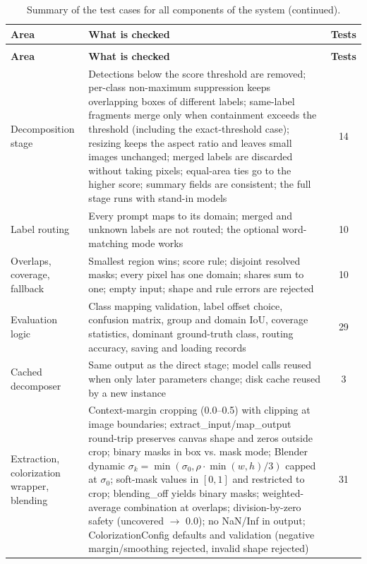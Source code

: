 \documentclass{FastFyp}
\begin{document}
 
\begin{longtable}{|p{3.4cm}|p{6.8cm}|c|}
\caption{Summary of the test cases for all components of the system.}
\label{tab:a_test_summary} \\
\hline
\textbf{Area} & \textbf{What is checked} & \textbf{Tests} \\ \hline
\endfirsthead
\caption[]{Summary of the test cases for all components of the system (continued).} \\
\hline
\textbf{Area} & \textbf{What is checked} & \textbf{Tests} \\ \hline
\endhead
\hline
\endfoot
\hline
\endlastfoot
Decomposition stage & Detections below the score threshold are removed; per-class non-maximum suppression keeps overlapping boxes of different labels; same-label fragments merge only when containment exceeds the threshold (including the exact-threshold case); resizing keeps the aspect ratio and leaves small images unchanged; merged labels are discarded without taking pixels; equal-area ties go to the higher score; summary fields are consistent; the full stage runs with stand-in models & 14 \\ \hline
Label routing & Every prompt maps to its domain; merged and unknown labels are not routed; the optional word-matching mode works & 10 \\ \hline
Overlaps, coverage, fallback & Smallest region wins; score rule; disjoint resolved masks; every pixel has one domain; shares sum to one; empty input; shape and rule errors are rejected & 10 \\ \hline
Evaluation logic & Class mapping validation, label offset choice, confusion matrix, group and domain IoU, coverage statistics, dominant ground-truth class, routing accuracy, saving and loading records & 29 \\ \hline
Cached decomposer & Same output as the direct stage; model calls reused when only later parameters change; disk cache reused by a new instance & 3 \\ \hline
Extraction, colorization wrapper, blending & Context-margin cropping (0.0--0.5) with clipping at image boundaries; extract\_input/map\_output round-trip preserves canvas shape and zeros outside crop; binary masks in box vs. mask mode; Blender dynamic $\sigma_k = \min(\sigma_0, \rho \cdot \min(w,h)/3)$ capped at $\sigma_0$; soft-mask values in $[0,1]$ and restricted to crop; blending\_off yields binary masks; weighted-average combination at overlaps; division-by-zero safety (uncovered $\to$ 0.0); no NaN/Inf in output; ColorizationConfig defaults and validation (negative margin/smoothing rejected, invalid shape rejected) & 31 \\ \hline

\end{longtable}
\end{document}
